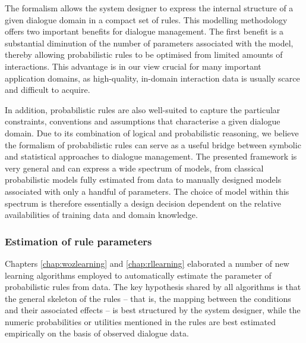 The formalism allows the system designer to express the internal structure of a given dialogue domain in a compact set of rules. This modelling methodology offers two important benefits for dialogue management.  The first benefit is a substantial diminution of the number of parameters associated with the model, thereby allowing probabilistic rules to be optimised from limited amounts of interactions. This advantage is in our view crucial for many important application domains, as high-quality, in-domain interaction data is usually scarce and difficult to acquire.

In addition, probabilistic rules are also well-suited to capture the particular constraints, conventions and assumptions that characterise a given dialogue domain.  Due to its combination of logical and probabilistic reasoning, we believe the formalism of probabilistic rules can serve as a useful bridge between symbolic and statistical approaches to dialogue management.  The presented framework is very general and can express a wide spectrum of models, from classical probabilistic models fully estimated from data to manually designed models associated with only a handful of parameters. The choice of model within this spectrum is therefore essentially a design decision dependent on the relative availabilities of training data and domain knowledge.


\subsubsection*{Estimation of rule parameters}

Chapters \ref{chap:wozlearning} and \ref{chap:rllearning} elaborated a number of new learning algorithms employed to automatically estimate the parameter of probabilistic rules from data. The key hypothesis shared by all algorithms is that the general skeleton of the rules -- that is, the mapping between the conditions and their associated effects -- is best structured by the system designer, while the numeric probabilities or utilities mentioned in the rules are best estimated empirically on the basis of observed dialogue data. 

